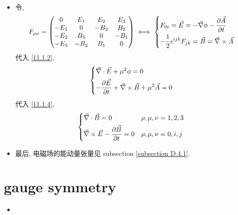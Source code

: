 \begin{itemize}
	\noindent\rule[0.5ex]{\linewidth}{0.5pt} %
	
	\item 令,
	\begin{equation}
		F_{\mu \nu} = \begin{pmatrix}
			0 & E_1 & E_2 & E_3 \\
			- E_1 & 0 & - B_3 & B_2 \\
			- E_2 & B_3 & 0 & - B_1 \\
			- E_3 & - B_2 & B_1 & 0
		\end{pmatrix} \iff \begin{dcases}
			F_{0 i} = \vec{E} = - \vec{\nabla} \phi - \frac{\partial \vec{A}}{\partial t} \\
			- \frac{1}{2} \epsilon^{i j k} F_{j k} = \vec{B} = \vec{\nabla} \times \vec{A}
		\end{dcases}
	\end{equation}
	代入 \eqref{11.1.2},
	\begin{equation}
		\begin{dcases}
			\vec{\nabla} \cdot \vec{E} + \mu^2 \phi = 0 \\
			- \frac{\partial \vec{E}}{\partial t} + \vec{\nabla} \times \vec{B} + \mu^2 \vec{A} = 0
		\end{dcases}
	\end{equation}
	代入 \eqref{11.1.4},
	\begin{equation}
		\begin{dcases}
			\vec{\nabla} \cdot \vec{B} = 0 & \rho, \mu, \nu = 1, 2, 3 \\
			\vec{\nabla} \times \vec{E} - \frac{\partial \vec{B}}{\partial t} = 0 & \rho, \mu, \nu = 0, i, j
		\end{dcases}
	\end{equation}
	
	\item 最后, 电磁场的能动量张量见 subsection \ref{subsection D.4.1}.
\end{itemize}

\section{gauge symmetry}
\begin{itemize}
	\item 
\end{itemize}
